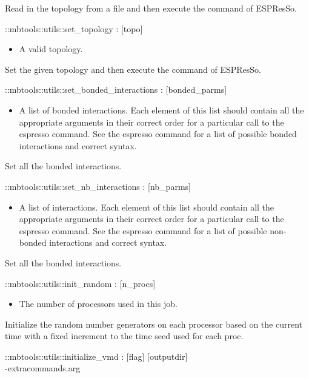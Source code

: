 Read in the topology from a file and then execute the  command of ESPResSo.
\begin{code}
  ::mbtools::utils::set_topology : [topo]
\end{code}
\begin{itemize}
\item {} A valid topology.
\end{itemize}
Set the given topology and then execute the  command of ESPResSo.
\begin{code}
  ::mbtools::utils::set_bonded_interactions : [bonded_parms]
\end{code}
\begin{itemize}
\item {} A list of bonded interactions. Each element
  of this list should contain all the appropriate arguments in their
  correct order for a particular call to the espresso 
  command. See the espresso  command for a list of
  possible bonded interactions and correct syntax.
\end{itemize}
Set all the bonded interactions.
\begin{code}
  ::mbtools::utils::set_nb_interactions : [nb_parms]
\end{code}
\begin{itemize}
\item {} A list of interactions. Each element of this
  list should contain all the appropriate arguments in their correct
  order for a particular call to the espresso 
  command. See the espresso  command for a list of
  possible non-bonded interactions and correct syntax.
\end{itemize}
Set all the bonded interactions.
\begin{code}
  ::mbtools::utils::init_random : [n_procs]
\end{code}
\begin{itemize}
\item {} The number of processors used in this job.
\end{itemize}
Initialize the random number generators on each processor based on the
current time with a fixed increment to the time seed used for each
proc.
\begin{code}
  ::mbtools::utils::initialize_vmd : [flag] [outputdir]\\
             [ident] -extracommands.arg
\end{code}
